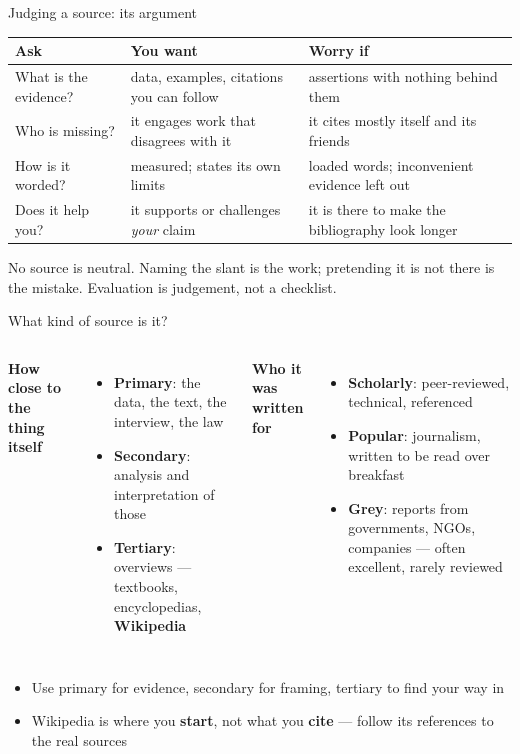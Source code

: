\documentclass[aspectratio=169]{beamer}
\begin{document}
\begin{frame}{Judging a source: its argument}
\small
\begin{tabular}{@{}p{}p{}p{}@{}}
\toprule
\textbf{Ask} & \textbf{You want} & \textbf{Worry if} \\
\midrule
What is the evidence? & data, examples, citations you can follow
                      & assertions with nothing behind them \\
\addlinespace
Who is missing?       & it engages work that disagrees with it
                      & it cites mostly itself and its friends \\
\addlinespace
How is it worded?     & measured; states its own limits
                      & loaded words; inconvenient evidence left out \\
\addlinespace
Does it help you?     & it supports or challenges \emph{your} claim
                      & it is there to make the bibliography look longer \\
\bottomrule
\end{tabular}
\vspace{1ex}

No source is neutral.  Naming the slant is the work; pretending it is not there
is the mistake.  Evaluation is judgement, not a checklist.
\end{frame}

\begin{frame}{What kind of source is it?}
\begin{columns}[T,onlytextwidth]
\textbf{How close to the thing itself}
\begin{itemize}
  \item \textbf{Primary}: the data, the text, the interview, the law
  \item \textbf{Secondary}: analysis and interpretation of those
  \item \textbf{Tertiary}: overviews --- textbooks, encyclopedias, \textbf{Wikipedia}
\end{itemize}

\textbf{Who it was written for}
\begin{itemize}
  \item \textbf{Scholarly}: peer-reviewed, technical, referenced
  \item \textbf{Popular}: journalism, written to be read over breakfast
  \item \textbf{Grey}: reports from governments, NGOs, companies --- often
    excellent, rarely reviewed
\end{itemize}
\end{columns}
\vspace{2ex}
\begin{itemize}
  \item Use primary for evidence, secondary for framing, tertiary to find your way in
  \item Wikipedia is where you \textbf{start}, not what you \textbf{cite} ---
    follow its references to the real sources
\end{itemize}
\end{frame}
\end{document}
